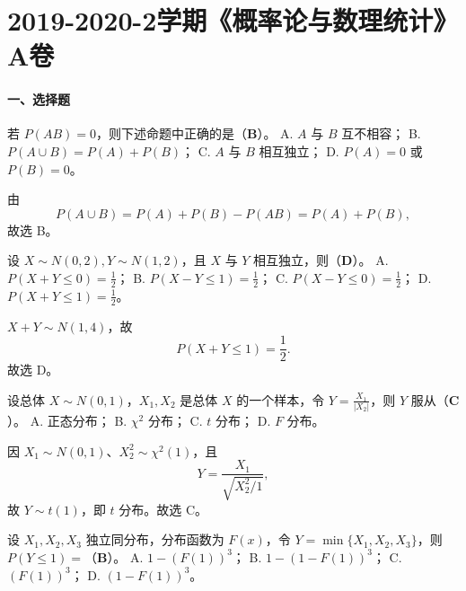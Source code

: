 \documentclass[lang=cn,11pt]{elegantbook}
\begin{document}
\section{2019-2020-2学期《概率论与数理统计》A卷}
\paragraph*{一、选择题}
\begin{exercise}
\par
若 \(P(AB)=0\)，则下述命题中正确的是（\( \boldsymbol{B} \)）。
A. \(A\) 与 \(B\) 互不相容；
B. \(P(A\cup B)=P(A)+P(B)\)；
C. \(A\) 与 \(B\) 相互独立；
D. \(P(A)=0\) 或 \(P(B)=0\)。
\end{exercise}

\begin{solution}
\par
由
\[
P(A\cup B)=P(A)+P(B)-P(AB)=P(A)+P(B),
\]
故选 B。
\end{solution}

\begin{exercise}
\par
设 \(X\sim N(0,2),Y\sim N(1,2)\)，且 \(X\) 与 \(Y\) 相互独立，则（\( \boldsymbol{D} \)）。
A. \(P(X+Y\le0)=\frac12\)；
B. \(P(X-Y\le1)=\frac12\)；
C. \(P(X-Y\le0)=\frac12\)；
D. \(P(X+Y\le1)=\frac12\)。
\end{exercise}

\begin{solution}
\par
\(X+Y\sim N(1,4)\)，故
\[
P(X+Y\le1)=\frac12.
\]
故选 D。
\end{solution}

\begin{exercise}
\par
设总体 \(X\sim N(0,1)\)，\(X_1,X_2\) 是总体 \(X\) 的一个样本，令 \(Y=\frac{X_1}{|X_2|}\)，则 \(Y\) 服从（\( \boldsymbol{C} \)）。
A. 正态分布； B. \(\chi^2\) 分布； C. \(t\) 分布； D. \(F\) 分布。
\end{exercise}

\begin{solution}
\par
因 \(X_1\sim N(0,1)\)、\(X_2^2\sim\chi^2(1)\)，且
\[
Y=\frac{X_1}{\sqrt{X_2^2/1}},
\]
故 \(Y\sim t(1)\)，即 \(t\) 分布。故选 C。
\end{solution}

\begin{exercise}
\par
设 \(X_1,X_2,X_3\) 独立同分布，分布函数为 \(F(x)\)，令 \(Y=\min\{X_1,X_2,X_3\}\)，则 \(P(Y\le1)=\)（\( \boldsymbol{B} \)）。
A. \(1-(F(1))^3\)； B. \(1-(1-F(1))^3\)； C. \((F(1))^3\)； D. \((1-F(1))^3\)。
\end{exercise}
\end{document}

